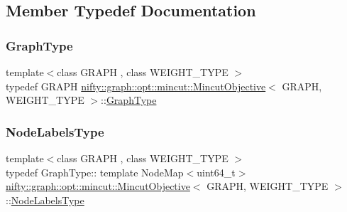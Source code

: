 \subsection{Member Typedef Documentation}
\mbox{\label{classnifty_1_1graph_1_1opt_1_1mincut_1_1MincutObjective_a3dbd0ae2a00c363dea7dcf771d0269dc}} 
\subsubsection{\texorpdfstring{Graph\+Type}{GraphType}}
{\footnotesize\ttfamily template$<$class G\+R\+A\+PH , class W\+E\+I\+G\+H\+T\+\_\+\+T\+Y\+PE $>$ \\
typedef G\+R\+A\+PH \hyperlink{classnifty_1_1graph_1_1opt_1_1mincut_1_1MincutObjective}{nifty\+::graph\+::opt\+::mincut\+::\+Mincut\+Objective}$<$ G\+R\+A\+PH, W\+E\+I\+G\+H\+T\+\_\+\+T\+Y\+PE $>$\+::\hyperlink{classnifty_1_1graph_1_1opt_1_1mincut_1_1MincutObjective_a3dbd0ae2a00c363dea7dcf771d0269dc}{Graph\+Type}}

\mbox{\label{classnifty_1_1graph_1_1opt_1_1mincut_1_1MincutObjective_af4e063aab4bfc02427e36be62091d18f}} 
\subsubsection{\texorpdfstring{Node\+Labels\+Type}{NodeLabelsType}}
{\footnotesize\ttfamily template$<$class G\+R\+A\+PH , class W\+E\+I\+G\+H\+T\+\_\+\+T\+Y\+PE $>$ \\
typedef Graph\+Type\+:: template Node\+Map$<$uint64\+\_\+t$>$ \hyperlink{classnifty_1_1graph_1_1opt_1_1mincut_1_1MincutObjective}{nifty\+::graph\+::opt\+::mincut\+::\+Mincut\+Objective}$<$ G\+R\+A\+PH, W\+E\+I\+G\+H\+T\+\_\+\+T\+Y\+PE $>$\+::\hyperlink{classnifty_1_1graph_1_1opt_1_1mincut_1_1MincutObjective_af4e063aab4bfc02427e36be62091d18f}{Node\+Labels\+Type}}


